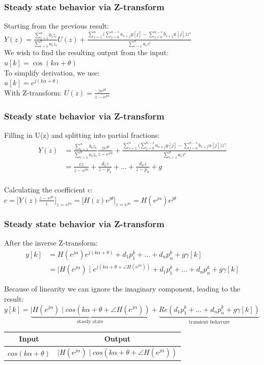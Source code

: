 \begin{frame}
	\frametitle{Steady state behavior via Z-transform}
	Starting from the previous result:\\
	$Y(z) = \frac{\sum\limits_{i=1}^{n} b_i z_i}{\sum\limits_{i=1}^{n} a_i z_i} U(z) + \frac{\sum\limits_{s=1}^{n}\Bigg(\sum\limits_{j=0}^{n-s}a_{s+j}y[j]-\sum\limits_{j=0}^{n-s}b_{s+j}u[j]\Bigg)z^{s}}{\sum\limits_{i=1}^{n}a_i z^i}$\\
	We wish to find the resulting output from the input:\\
	$ u[k] = \cos(k\alpha + \theta)$\\
	To simplify derivation, we use:\\
	$u[k] = e^{j(k\alpha + \theta)}$\\
	With Z-transform:	$U(z) = \frac{ze^{j\theta}}{z-e^{j\alpha}}$
	
\end{frame}
\begin{frame}
	\frametitle{Steady state behavior via Z-transform}
	Filling in U(z) and splitting into partial fractions:
	\begin{align*}
			Y(z) &= \frac{\sum\limits_{i=1}^{n} b_i z_i}{\sum\limits_{i=1}^{n} a_i z_i} \frac{ze^{j\theta}}{z-e^{j\alpha}} + \frac{\sum\limits_{s=1}^{n}\Bigg(\sum\limits_{j=0}^{n-s}a_{s+j}y[j]-\sum\limits_{j=0}^{n-s}b_{s+j}u[j]\Bigg)	z^{s}}{\sum\limits_{i=1}^{n} a_i z^{i}}\\
			& = \frac{cz}{z-e^{j\alpha}} + \frac{d_1z}{z-p_1} + \dots + \frac{d_nz}{z-p_n}+g\\
	\end{align*}
	
	Calculating the coefficient c:\\
	$c= \bigg[Y(z)\frac{z-e^{j\alpha}}{z}\bigg]_{z=e^{j\alpha}} = \bigg[H(z)e^{j\theta}\bigg]_{z=e^{j\alpha}} = H(e^{j\alpha})e^{j\theta}$\\

\end{frame}
\begin{frame}
	\frametitle{Steady state behavior via Z-transform}
	\small{
		After the inverse Z-transform:
		\begin{align*}			y[k]&=H(e^{j\alpha})e^{j(k\alpha+\theta)}+d_1p_1^k+\dots+d_np_n^{k}+g\gamma[k]\\
		 &= \mid H(e^{j\alpha}) \mid e^{j(k\alpha+\theta+\angle H(e^{j\alpha}))} +d_1p_1^k+\dots+d_np_n^{k}+g\gamma[k]
		\end{align*}
		
	Because of linearity we can ignore the imaginary component, leading to the result:\\
	$y[k] =  \underbrace{\mid H(e^{j\alpha}) \mid cos(k\alpha+\theta+\angle H(e^{j\alpha}))}_{\text{staedy state}} + \underbrace{Re(d_1p_1^k+\dots+d_np_n^{k}+g\gamma[k])}_{\text{transient behavure}}$\\
	\begin{tabular}{|c|c|}
		\hline Input & Output \\ 
		\hline $cos(k\alpha + \theta)$ &  $\mid H(e^{j\alpha}) \mid cos(k\alpha+\theta+\angle H(e^{j\alpha}))$ \\ 
		\hline 
	\end{tabular} }
\end{frame}
